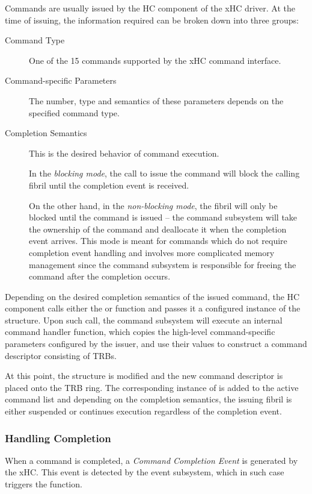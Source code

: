 Commands are usually issued by the HC component of the xHC driver. At the time
of issuing, the information required can be broken down into three groups:
~
\begin{description}
	\item[Command Type]
		One of the 15 commands supported by the xHC command interface.
	\item[Command-specific Parameters]
		The number, type and semantics of these parameters depends on the
		specified command type.
	\item[Completion Semantics]
		This is the desired behavior of command execution.

		In the \textit{blocking mode}, the call to issue the command will block
		the calling fibril until the completion event is received.

		On the other hand, in the \textit{non-blocking mode}, the fibril will
		only be blocked until the command is issued -- the command subsystem
		will take the ownership of the command and deallocate it when the
		completion event arrives. This mode is meant for commands which do not
		require completion event handling and involves more complicated memory
		management since the command subsystem is responsible for freeing the
		command after the completion occurs.
\end{description}

Depending on the desired completion semantics of the issued command, the HC
component calls either the  or 
function and passes it a configured instance of the  structure.
Upon such call, the command subsystem will execute an internal command handler
function, which copies the high-level command-specific parameters configured by
the issuer, and use their values to construct a command descriptor consisting of
TRBs.

At this point, the  structure is modified and the new
command descriptor is placed onto the TRB ring. The corresponding instance of
 is added to the active command list and depending on the
completion semantics, the issuing fibril is either suspended or continues
execution regardless of the completion event.


\subsubsection{Handling Completion}

When a command is completed, a \textit{Command Completion Event} is generated by
the xHC. This event is detected by the event subsystem, which in such case
triggers the  function.


